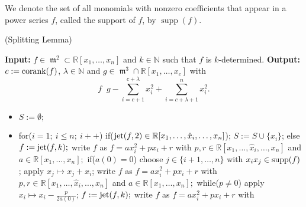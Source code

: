 \documentclass[noend]{amsproc}
\DeclareMathOperator{\requiv}{\overset{r}{\sim}}
\DeclareMathOperator{\m}{\mathfrak{m}}
\DeclareMathOperator{\supp}{supp}
\begin{document}
We denote the set of all monomials with nonzero coefficients that appear in a
power series $f$, called the support of $f$, by $\supp(f)$.

\begin{AlgorithmSplittingLemma}(Splitting Lemma)\label{AlgorithmSplittingLemma}
\end{AlgorithmSplittingLemma}
\noindent\textnormal{\bf Input:} $f\in \m^2\subset\mathbb
R[x_1,\ldots,x_n]$ and $k\in\mathbb N$ such that $f$ is
$k$-determined.\newline
\textnormal{\bf Output:} $c:=\textnormal{corank}(f)$, $\lambda\in\mathbb
N$ and
$g\in \m^3\cap\mathbb R[x_1,\ldots,x_c]$ with \[\displaystyle
f\requiv g-\sum_{i=c+1}^{c+\lambda} x_i^2+\sum_{i=c+\lambda+1}^nx_i^2.\]
\begin{itemize}
\item $S:=\emptyset;$
\item for($i=1;\ i\le n;\  i++$)\newline
\phantom{}\quad if($\textnormal{jet}(f,2)\in \mathbb R[x_1,\ldots,\hat
x_i,\ldots,x_n]$);\newline
\phantom{}\quad\quad $S:=S\cup\{x_i\}$;\newline
\phantom{}\quad else\newline
\phantom{}\quad\quad $f:=\textnormal{jet}(f,k);$\newline
\phantom{}\quad\quad write $f$ as $f=ax_i^2+px_i+r$ with $p,r\in\mathbb
R[x_1,\ldots,\hat x_i,\ldots,x_n]$\newline
\phantom{}\quad\quad and $a\in\mathbb R[x_1,\ldots,x_n];$\newline
\phantom{}\quad\quad if($a(0)=0$)\newline
\phantom{}\quad\quad\quad choose $j\in\{i+1,\ldots,n\}$ with
$x_ix_j\in\textnormal{supp}(f)$;\newline
\phantom{}\quad\quad\quad apply $x_j\mapsto x_j+x_i$;\newline
\phantom{}\quad\quad\quad write $f$ as $f=ax_i^2+px_i+r$ with $p,r\in\mathbb
R[x_1,\ldots,\hat x_i,\ldots,x_n]$\newline
\phantom{}\quad\quad\quad and $a\in\mathbb R[x_1,\ldots,x_n];$\newline
\phantom{}\quad\quad\quad\quad while($p\neq 0$)\newline
\phantom{}\quad\quad\quad\quad\quad apply $x_i\mapsto
x_i-\frac{p}{2a(0)}$;\newline
\phantom{}\quad\quad\quad\quad\quad $f:=\textnormal{jet}(f,k);$\newline
\phantom{}\quad\quad\quad\quad\quad write $f$ as $f=ax_i^2+px_i+r$ with

\end{itemize}
\end{document}
